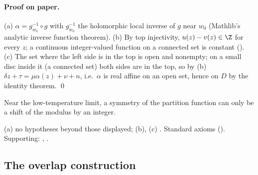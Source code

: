 \paragraph{Proof on paper.}  (a) $\alpha=g_{w_0}^{-1}\circ g$ with $g_{w_0}^{-1}$ the holomorphic local inverse of $g$ near $w_0$
(Mathlib's analytic inverse function theorem).  (b) By top injectivity, $u(z)-v(z)\in\Z$ for every $z$; a continuous integer-valued
function on a connected set is constant ().  (c) The set where the left side is in the top is
open and nonempty; on a small disc inside it (a connected set) both sides are in the top, so by (b) $\delta z+\tau=\mu\alpha(z)+\nu+n$, i.e.\ $\alpha$ is real affine on an open set,
hence on $D$ by the identity theorem. \qed
\begin{physics}Near the low-temperature limit, a symmetry of the partition function can only be a shift of the modulus by an
integer.\end{physics}
\begin{status}(a) no hypotheses beyond those displayed; (b), (c) .  Standard axioms
().  Supporting: , .\end{status}

\subsection{The overlap construction}


